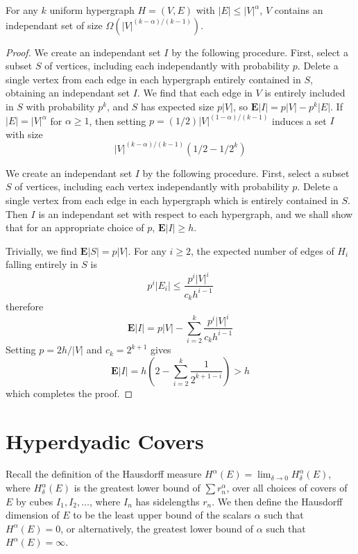 \begin{lemma}[Tur\'{a}n]
    For any $k$ uniform hypergraph $H = (V,E)$ with $|E| \leq |V|^\alpha$, $V$ contains an independant set of size $\Omega(|V|^{(k-\alpha)/(k-1)})$.
\end{lemma}
\begin{proof}
    We create an independant set $I$ by the following procedure. First, select a subset $S$ of vertices, including each independantly with probability $p$. Delete a single vertex from each edge in each hypergraph entirely contained in $S$, obtaining an independant set $I$. We find that each edge in $V$ is entirely included in $S$ with probability $p^k$, and $S$ has expected size $p |V|$, so $\mathbf{E}|I| = p |V| - p^k |E|$. If $|E| = |V|^\alpha$ for $\alpha \geq 1$, then setting $p = (1/2) |V|^{(1 - \alpha)/(k-1)}$ induces a set $I$ with size
    \[ |V|^{(k - \alpha)/(k-1)}(1/2 - 1/2^k) \]

    We create an independant set $I$ by the following procedure. First, select a subset $S$ of vertices, including each vertex independantly with probability $p$. Delete a single vertex from each edge in each hypergraph which is entirely contained in $S$. Then $I$ is an independant set with respect to each hypergraph, and we shall show that for an appropriate choice of $p$, $\mathbf{E} |I| \geq h$.

    Trivially, we find $\mathbf{E}|S| = p |V|$. For any $i \geq 2$, the expected number of edges of $H_i$ falling entirely in $S$ is
    \[ p^i |E_i| \leq \frac{p^i |V|^i}{c_k h^{i-1}} \]
    therefore
    \[ \mathbf{E}|I| = p|V| - \sum_{i = 2}^k \frac{p^i |V|^i}{c_k h^{i-1}} \]
    Setting $p = 2h/|V|$ and $c_k = 2^{k+1}$ gives
    \[ \mathbf{E}|I| = h \left( 2 - \sum_{i = 2}^k \frac{1}{2^{k+1-i}} \right) > h \]
    which completes the proof.
\end{proof}

\section{Hyperdyadic Covers}

Recall the definition of the Hausdorff measure $H^\alpha(E) = \lim_{\delta \to 0} H^\alpha_\delta(E)$, where $H^\alpha_\delta(E)$ is the greatest lower bound of $\sum r_n^\alpha$, over all choices of covers of $E$ by cubes $I_1, I_2, \dots$, where $I_n$ has sidelengths $r_n$. We then define the Hausdorff dimension of $E$ to be the least upper bound of the scalars $\alpha$ such that $H^\alpha(E) = 0$, or alternatively, the greatest lower bound of $\alpha$ such that $H^\alpha(E) = \infty$.

